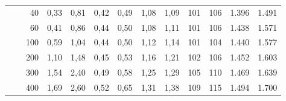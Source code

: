 \begin{table}[p]
\begin{tabular}{|l|l|r|r|r|r|r|r|r|r|r|r|r|}
 &  & 40 & 0,33 & 0,81 & 0,42 & 0,49 & 1,08 & 1,09 & 101 & 106 & 1.396 & 1.491 \\
 &  & 60 & 0,41 & 0,86 & 0,44 & 0,50 & 1,08 & 1,11 & 101 & 106 & 1.438 & 1.571 \\
 &  & 100 & 0,59 & 1,04 & 0,44 & 0,50 & 1,12 & 1,14 & 101 & 104 & 1.440 & 1.577 \\
 &  & 200 & 1,10 & 1,48 & 0,45 & 0,53 & 1,16 & 1,21 & 102 & 106 & 1.452 & 1.603 \\
 &  & 300 & 1,54 & 2,40 & 0,49 & 0,58 & 1,25 & 1,29 & 105 & 110 & 1.469 & 1.639 \\
 &  & 400 & 1,69 & 2,60 & 0,52 & 0,65 & 1,31 & 1,38 & 109 & 115 & 1.494 & 1.700 \\
\hline
\end{tabular}
\end{table}

